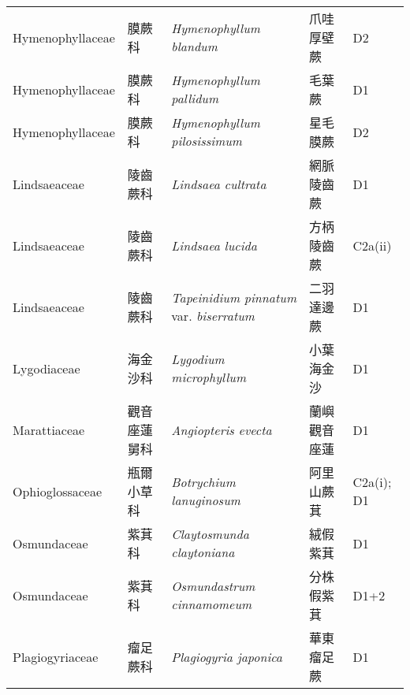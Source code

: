 {\begin{longtable}{p{2.5cm}p{2.5cm}p{4.5cm}p{2.5cm}p{3cm}}
    Hymenophyllaceae & 膜蕨科 & \textit{Hymenophyllum blandum}  & 爪哇厚壁蕨 & D2 \index{Hymenophyllum@\textit{Hymenophyllum}!blandum@\textit{blandum}}  \index{爪哇厚壁蕨} \\
    Hymenophyllaceae & 膜蕨科 & \textit{Hymenophyllum pallidum}  & 毛葉蕨 & D1 \index{Hymenophyllum@\textit{Hymenophyllum}!pallidum@\textit{pallidum}}  \index{毛葉蕨} \\
    Hymenophyllaceae & 膜蕨科 & \textit{Hymenophyllum pilosissimum}  & 星毛膜蕨 & D2 \index{Hymenophyllum@\textit{Hymenophyllum}!pilosissimum@\textit{pilosissimum}}  \index{星毛膜蕨} \\
    Lindsaeaceae & 陵齒蕨科 & \textit{Lindsaea cultrata}  & 網脈陵齒蕨 & D1 \index{Lindsaea@\textit{Lindsaea}!cultrata@\textit{cultrata}}  \index{網脈陵齒蕨} \\
    Lindsaeaceae & 陵齒蕨科 & \textit{Lindsaea lucida}  & 方柄陵齒蕨 & C2a(ii) \index{Lindsaea@\textit{Lindsaea}!lucida@\textit{lucida}}  \index{方柄陵齒蕨} \\
    Lindsaeaceae & 陵齒蕨科 & \textit{Tapeinidium pinnatum} var. \textit{biserratum}  & 二羽達邊蕨 & D1 \index{Tapeinidium@\textit{Tapeinidium}!pinnatum@\textit{pinnatum}!var. biserratum@var. \textit{biserratum}}  \index{二羽達邊蕨} \\
    Lygodiaceae & 海金沙科 & \textit{Lygodium microphyllum}  & 小葉海金沙 & D1 \index{Lygodium@\textit{Lygodium}!microphyllum@\textit{microphyllum}}  \index{小葉海金沙} \\
    Marattiaceae & 觀音座蓮舅科 & \textit{Angiopteris evecta}  & 蘭嶼觀音座蓮 & D1 \index{Angiopteris@\textit{Angiopteris}!evecta@\textit{evecta}}  \index{蘭嶼觀音座蓮} \\
    Ophioglossaceae & 瓶爾小草科 & \textit{Botrychium lanuginosum}  & 阿里山蕨萁 & C2a(i); D1 \index{Botrychium@\textit{Botrychium}!lanuginosum@\textit{lanuginosum}}  \index{阿里山蕨萁} \\
    Osmundaceae & 紫萁科 & \textit{Claytosmunda claytoniana}  & 絨假紫萁 & D1 \index{Claytosmunda@\textit{Claytosmunda}!claytoniana@\textit{claytoniana}}  \index{絨假紫萁} \\
    Osmundaceae & 紫萁科 & \textit{Osmundastrum cinnamomeum}  & 分株假紫萁 & D1+2 \index{Osmundastrum@\textit{Osmundastrum}!cinnamomeum@\textit{cinnamomeum}}  \index{分株假紫萁} \\
    Plagiogyriaceae & 瘤足蕨科 & \textit{Plagiogyria japonica}  & 華東瘤足蕨 & D1 \index{Plagiogyria@\textit{Plagiogyria}!japonica@\textit{japonica}}  \index{華東瘤足蕨} \\

\end{longtable}}
